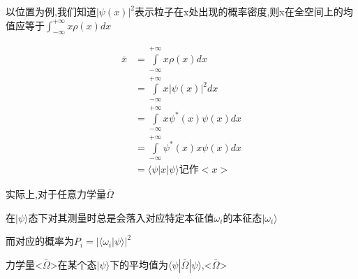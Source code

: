 \documentclass[lang=cn,10pt]{elegantbook}
\begin{document}
 以位置为例,我们知道$|\psi(x)|^2$表示粒子在x处出现的概率密度,则x在全空间上的均值应等于$\int_{-\infty}^{+\infty}x\rho(x)dx$
 
 \begin{equation*}
 	\begin{split}
 		\bar{x}&=\int\limits_{-\infty}^{+\infty}{x\rho \left( x \right) dx}
 		\\
 		&=\int\limits_{-\infty}^{+\infty}{x|\psi \left( x \right) |^2dx}
 		\\
 		&=\int\limits_{-\infty}^{+\infty}{x\psi ^*\left( x \right) \psi \left( x \right) dx}
 		\\
 		&=\int\limits_{-\infty}^{+\infty}{\psi ^*\left( x \right) x\psi \left( x \right) dx}
 		\\
 		&=\langle \psi |x|\psi \rangle \text{记作}<x>
 	\end{split}
 \end{equation*}
 
 实际上,对于任意力学量$\bar{\Omega}$
 
 在$|\psi\rangle$态下对其测量时总是会落入对应特定本征值$\omega_i$的本征态$|\omega_i\rangle$
 
 而对应的概率为$P_i =|\langle\omega_i|\psi\rangle|^2$
 
 力学量<$\bar{\Omega}$>在某个态$|\psi\rangle$下的平均值为$\langle\psi|\bar{\Omega}|\psi\rangle$,<$\bar{\Omega}$>
 
\end{document}
